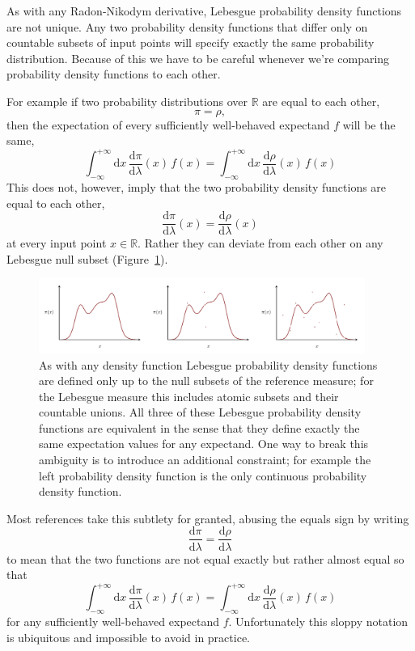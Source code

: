 \documentclass[
  letterpaper,
  DIV=11,
  numbers=noendperiod]{scrartcl}
\begin{document}
As with any Radon-Nikodym derivative, Lebesgue probability density
functions are not unique. Any two probability density functions that
differ only on countable subsets of input points will specify exactly
the same probability distribution. Because of this we have to be careful
whenever we're comparing probability density functions to each other.

For example if two probability distributions over \(\mathbb{R}\) are
equal to each other, \[
\pi = \rho,
\] then the expectation of every sufficiently well-behaved expectand
\(f\) will be the same, \[
\int_{-\infty}^{+\infty} \mathrm{d} x \,
\frac{ \mathrm{d} \pi }{ \mathrm{d} \lambda}(x)
\, f(x)
=
\int_{-\infty}^{+\infty} \mathrm{d} x \,
\frac{ \mathrm{d} \rho }{ \mathrm{d} \lambda}(x)
\, f(x)
\] This does not, however, imply that the two probability density
functions are equal to each other, \[
\frac{ \mathrm{d} \pi }{ \mathrm{d} \lambda}(x)
=
\frac{ \mathrm{d} \rho }{ \mathrm{d} \lambda}(x)
\] at every input point \(x \in \mathbb{R}\). Rather they can deviate
from each other on any Lebesgue null subset
(Figure~\ref{fig-equivalent-density-functions}).

\begin{figure}

{\centering \includegraphics[width=0.95\textwidth,height=\textheight]{figures/equivalent_density_functions/equivalent_density_functions.pdf}

}

\caption{\label{fig-equivalent-density-functions}As with any density
function Lebesgue probability density functions are defined only up to
the null subsets of the reference measure; for the Lebesgue measure this
includes atomic subsets and their countable unions. All three of these
Lebesgue probability density functions are equivalent in the sense that
they define exactly the same expectation values for any expectand. One
way to break this ambiguity is to introduce an additional constraint;
for example the left probability density function is the only continuous
probability density function.}

\end{figure}

Most references take this subtlety for granted, abusing the equals sign
by writing \[
\frac{ \mathrm{d} \pi }{ \mathrm{d} \lambda}
=
\frac{ \mathrm{d} \rho }{ \mathrm{d} \lambda}
\] to mean that the two functions are not equal exactly but rather
almost equal so that \[
\int_{-\infty}^{+\infty} \mathrm{d} x \,
\frac{ \mathrm{d} \pi }{ \mathrm{d} \lambda}(x)
\, f(x)
=
\int_{-\infty}^{+\infty} \mathrm{d} x \,
\frac{ \mathrm{d} \rho }{ \mathrm{d} \lambda}(x)
\, f(x)
\] for any sufficiently well-behaved expectand \(f\). Unfortunately this
sloppy notation is ubiquitous and impossible to avoid in practice.
\end{document}
